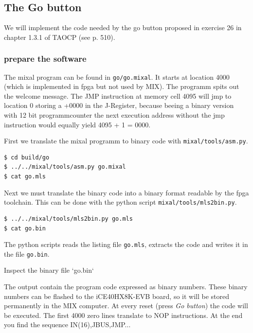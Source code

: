 \documentclass[a4paper,ngerman]{scrartcl}
\begin{document}
\subsection{The Go button}
We will implement the code needed by the go button proposed in  exercise 26 in chapter 1.3.1 of TAOCP (see p. 510).

\subsubsection{prepare the software}
The mixal program can be found in \lstinline|go/go.mixal|. It starts at location 4000 (which is implemented in fpga but not used by MIX). The programm spits out the welcome message. The JMP instruction at memory cell 4095 will jmp to location 0 storing a +0000 in the J-Register, because beeing a binary version with 12 bit programmcounter the next execution address without the jmp instruction would equally yield 4095 + 1 = 0000.




First we translate the mixal programm to binary code with \lstinline|mixal/tools/asm.py|.

\begin{lstlisting}[numbers=none,frame=none]
$ cd build/go
$ ../../mixal/tools/asm.py go.mixal
$ cat go.mls
\end{lstlisting}



Next we must translate the binary code into a binary format readable by the fpga toolchain. This can be done with the python script \lstinline|mixal/tools/mls2bin.py|.

\begin{lstlisting}[numbers=none,frame=none]
$ ../../mixal/tools/mls2bin.py go.mls
$ cat go.bin
\end{lstlisting}



The python scripts reads the listing file \lstinline|go.mls|, extracts the code and writes it in the file \lstinline|go.bin|.

Inspect the binary file `go.bin`





The output contain the program code expressed as binary numbers. These binary numbers can be flashed to the iCE40HX8K-EVB board, so it will be stored permanently in the MIX computer. At every reset (press \textit{Go button}) the code will be executed. The first 4000 zero lines translate to NOP instructions. At the end you find the sequence IN(16),JBUS,JMP...
\end{document}
